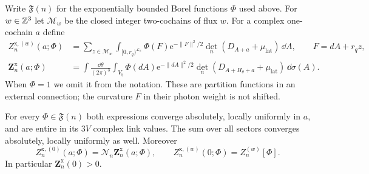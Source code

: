 Write $\mathfrak F(n)$ for the exponentially bounded
Borel functions $\Phi$ used above. For $w\in\mathbb Z^3$ let
$\mathcal M_w$ be the closed integer two-cochains of
flux $w$. For a complex one-cochain $a$ define
\begin{align}
 Z_n^{\mathrm{x},(w)}(a;\Phi)
  &=\sum_{z\in\mathcal M_w}\int_{[0,r_q)^{\mathcal L_n}}
       \Phi(F)\mathrm e^{-\|F\|^2/2}
                \det_n(D_{A+a}+\mu_{\mathrm{lat}})\,\dd A,
       \qquad F=dA+r_qz,\label{eq:external-sector-source}\\
 \mathbf Z_n^{\mathrm{x}}(a;\Phi)
  &=\int\frac{\dd\theta}{(2\pi)^3}
       \int_{V_{\mathrm t}}\Phi(dA)\mathrm e^{-\|dA\|^2/2}
       \det_n(D_{A+H_\theta+a}+\mu_{\mathrm{lat}})\,\dd\sigma(A).
                                  \label{eq:external-averaged-source}
\end{align}
When $\Phi=1$ we omit it from the notation. These are
partition functions in an external connection; the
curvature $F$ in their photon weight is not shifted.

\begin{proposition}\label{prop:external-entire}
For every $\Phi\in\mathfrak F(n)$ both expressions
converge absolutely, locally uniformly in $a$, and are
entire in its $3V$ complex link values. The sum over
all sectors converges absolutely, locally uniformly
as well. Moreover
\begin{equation}\label{eq:external-source-zero-sector}
 Z_n^{\mathrm{x},(0)}(a;\Phi)
             =\mathcal N_n\mathbf Z_n^{\mathrm{x}}(a;\Phi),
 \qquad
 Z_n^{\mathrm{x},(w)}(0;\Phi)=Z_n^{(w)}[\Phi].
\end{equation}
In particular $\mathbf Z_n^{\mathrm{x}}(0)>0$.
\end{proposition}

